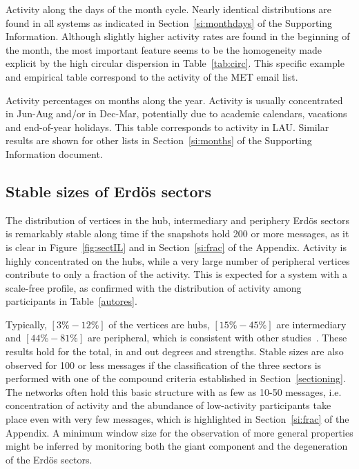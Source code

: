 \FloatBarrier

\begin{table}
\caption{Activity along the days of the month cycle.
Nearly identical distributions are found in all systems
as indicated in Section~\ref*{si:monthdays} of the Supporting Information. Although slightly higher activity rates are found in the beginning of the month, the most important feature seems to be the homogeneity made explicit by the high circular dispersion in Table~\ref{tab:circ}.
This specific example and empirical table correspond to the activity of the MET email list.}
\footnotesize

\label{tab:min}
\end{table}

\begin{table}
\caption{Activity percentages on months along the year. 	Activity is usually concentrated in Jun-Aug and/or in Dec-Mar, potentially due to academic calendars, vacations and end-of-year holidays. This table corresponds to activity in LAU. Similar results are shown for other lists in Section~\ref*{si:months} of the Supporting Information document.}
\footnotesize

\label{tab:min2}
\end{table}


\subsection{Stable sizes of Erd\"os sectors}\label{subsec:pih}

The distribution of vertices in the hub, intermediary and periphery Erd\"os sectors is remarkably stable along time if the snapshots hold 200 or more messages,
as it is clear in Figure~\ref{fig:sectIL} and in Section~\ref{si:frac} of the Appendix. 
Activity is highly concentrated on the hubs, while a very large number of peripheral vertices contribute to only a fraction of the activity.
This is expected for a system with a scale-free profile, as confirmed with the distribution of activity among participants in Table~\ref{autores}.

Typically, $[3\%-12\%]$ of the vertices are hubs,
$[15\%-45\%]$ are intermediary and $[44\%-81\%]$ are peripheral,
which is consistent with other studies~\cite{secFree}.
These results hold for the total, in and out degrees and strengths.
Stable sizes are also observed for 100 or less messages if the classification 
of the three sectors is performed with one of the compound criteria established in Section~\ref{sectioning}. The networks often hold this basic structure with as few as 10-50 messages, i.e. concentration of activity and the abundance of low-activity participants take place even with very few messages, which is highlighted in Section~\ref{si:frac} of the Appendix.
A minimum window size for the observation of more general properties might be inferred by monitoring 
both the giant component and the degeneration of the Erd\"os sectors.

